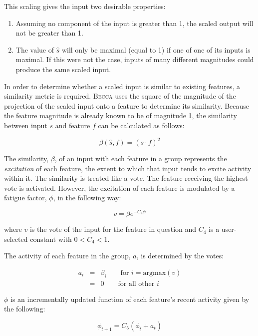 This scaling gives the input two desirable properties: 
\begin{enumerate}
\item Assuming no component of the input is greater than 1, the scaled output will not be greater than 1.
\item The value of $\hat{s}$ will only be maximal (equal to 1) if one of one of its inputs is maximal. If this were not the case, inputs of many different magnitudes could produce the same scaled input.
\end{enumerate} 

In order to determine whether a scaled input is similar to existing features, a similarity metric is required. \textsc{Becca} uses the square of the magnitude of the projection of the scaled input onto a feature to determine its similarity. Because the feature magnitude is already known to be of magnitude 1, the similarity between input $s$ and feature $f$ can be calculated as follows:

\begin{equation}
\beta(\hat{s}, f) = (s \cdot f)^2
\end{equation}

The similarity, $\beta$, of an input with each feature in a group represents the {\em excitation} of each feature, the extent to which that input tends to excite activity within it. The similarity is treated like a vote. The feature receiving the highest vote is activated. However, the excitation of each feature is modulated by a fatigue factor, $\phi$, in the following way:

\begin{equation}
v =  \beta e^{-C_4 \phi}
\end{equation}

where $v$ is the vote of the input for the feature in question and $C_4$ is a user-selected constant with $0 < C_4 < 1$. 

The activity of each feature in the group, $a$, is determined by the votes:

\begin{eqnarray}
a_i& = &\beta_i  \qquad \mbox{for } i = \mbox{argmax}(v) \\
&= &0 \qquad \mbox{for all other } i
\end{eqnarray}

$\phi$ is an incrementally updated function of each feature's recent activity given by the following:

\begin{equation}
\phi_{t+1} = C_5 ( \phi_{t} + a_{t})
\end{equation}

